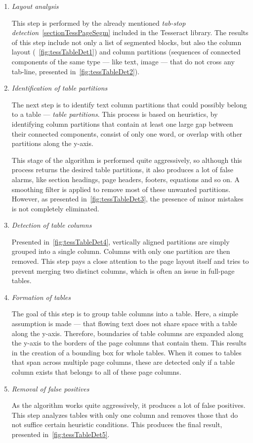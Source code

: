\begin{enumerate}
\item \emph{Layout analysis}

This step is performed by the already mentioned \emph{tab-stop detection}~\cref{sectionTessPageSegm} included in the Tesseract library. The results of this step include not only a list of segmented blocks, but also the column layout (~\cref{fig:tessTableDet1}) and column partitions (sequences of connected components of the same type --- like text, image --- that do not cross any tab-line, presented in~\cref{fig:tessTableDet2}).

\item \emph{Identification of table partitions}

The next step is to identify text column partitions that could possibly belong to a table --- \emph{table partitions}. This process is based on heuristics, by identifying column partitions that contain at least one large gap between their connected components, consist of only one word, or overlap with other partitions along the y-axis.

This stage of the algorithm is performed quite aggressively, so although this process returns the desired table partitions, it also produces a lot of false alarms, like section headings, page headers, footers, equations and so on. A smoothing filter is applied to remove most of these unwanted partitions. However, as presented in~\cref{fig:tessTableDet3}, the presence of minor mistakes is not completely eliminated.

\item \emph{Detection of table columns}

Presented in~\cref{fig:tessTableDet4}, vertically aligned partitions are simply grouped into a single column. Columns with only one partition are then removed. This step pays a close attention to the page layout itself and tries to prevent merging two distinct columns, which is often an issue in full-page tables.

\item \emph{Formation of tables}

The goal of this step is to group table columns into a table. Here, a simple assumption is made --- that flowing text does not share space with a table along the y-axis. Therefore, boundaries of table columns are expanded along the y-axis to the borders of the page columns that contain them. This results in the creation of a bounding box for whole tables. When it comes to tables that span across multiple page columns, these are detected only if a table column exists that belongs to all of these page columns.

\item \emph{Removal of false positives}

As the algorithm works quite aggressively, it produces a lot of false positives. This step analyzes tables with only one column and removes those that do not suffice certain heuristic conditions. This produces the final result, presented in~\cref{fig:tessTableDet5}.

\end{enumerate}

